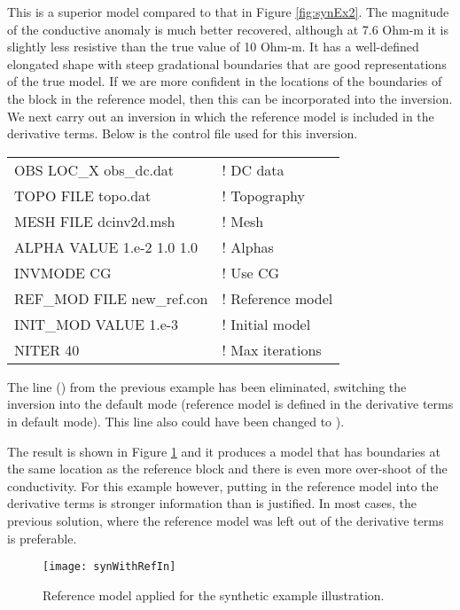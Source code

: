 This is a superior model compared to that in Figure \ref{fig:synEx2}. The magnitude of the conductive anomaly is much better recovered, although at 7.6 Ohm-m it is slightly less resistive than the true value of 10 Ohm-m. It has a well-defined elongated shape with steep gradational boundaries that are good representations of the true model.
If we are more confident in the locations of the boundaries of the block in the reference model, then this can be incorporated into the inversion. We next carry out an inversion in which the reference model is included in the derivative terms. Below is the control file used for this inversion.
%
\begin{fileExample}
\begin{tabular}{|ll|}
\hline
OBS LOC\_X obs\_dc.dat & ! DC data \\
TOPO FILE topo.dat & ! Topography\\
MESH FILE dcinv2d.msh & ! Mesh \\
ALPHA VALUE 1.e-2 1.0 1.0 & ! Alphas \\
INVMODE CG & ! Use CG \\
REF\_MOD FILE new\_ref.con & ! Reference model \\
INIT\_MOD VALUE 1.e-3 & ! Initial model \\
NITER 40 & ! Max iterations \\
\hline
\end{tabular}
\end{fileExample}
%
The line () from the previous example has been eliminated, switching the inversion into the default mode (reference model is defined in the derivative terms in default mode). This line also could have been changed to ).

The result is shown in Figure \ref{fig:synWithRefIn} and it produces a model that has boundaries at the same location as the reference block and there is even more over-shoot of the conductivity. For this example however, putting in the reference model into the derivative terms is stronger information than is justified. In most cases, the previous solution, where the reference model was left out of the derivative terms is preferable.
%
\begin{figure}
\centering
\texttt{[image: synWithRefIn]}
\caption{Reference model applied for the synthetic example illustration.}
\label{fig:synWithRefIn}
\end{figure}

